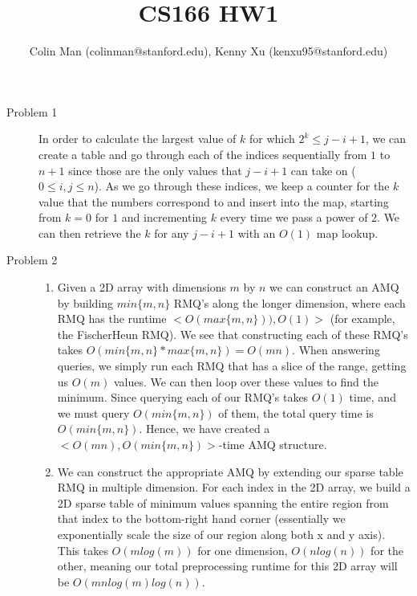 \documentclass[11pt,oneside,a4paper]{article}
\begin{document}
\title{CS166 HW1}
\author{Colin Man (colinman@stanford.edu), Kenny Xu (kenxu95@stanford.edu)}

\maketitle

\begin{description}

\item[Problem 1]\noindent
In order to calculate the largest value of $k$ for which $2^k \leq j - i + 1$, we can create a table and go through each of the indices sequentially from $1$ to $n + 1$ since those are the only values that $j-i+1$ can take on ($0\leq i,j \leq n$). As we go through these indices, we keep a counter for the $k$ value that the numbers correspond to and insert into the map, starting from $k=0$ for $1$ and incrementing $k$ every time we pass a power of $2$. We can then retrieve the $k$ for any $j-i+1$ with an $O(1)$ map lookup.

\newpage

\item[Problem 2]\noindent
\begin{enumerate}[label=\roman*]
\item Given a 2D array with dimensions $m$ by $n$ we can construct an AMQ by building $min\{m, n\}$ RMQ's along the longer dimension, where each RMQ has the runtime $< O(max\{m, n\})), O(1)>$ (for example, the FischerHeun RMQ). We see that constructing each of these RMQ's takes $O(min\{m, n\} * max\{m, n\}) = O(mn)$. When answering queries, we simply run each RMQ that has a slice of the range, getting us $O(m)$ values. We can then loop over these values to find the minimum. Since querying each of our RMQ's takes $O(1)$ time, and we must query $O(min\{m, n\})$ of them, the total query time is $O(min\{m, n\})$. Hence, we have created a $<O(mn), O(min\{m, n\})>$-time AMQ structure.

\item We can construct the appropriate AMQ by extending our sparse table RMQ in multiple dimension. For each index in the 2D array, we build a 2D sparse table of minimum values spanning the entire region from that index to the bottom-right hand corner (essentially we exponentially scale the size of our region along both x and y axis). This takes $O(mlog(m))$ for one dimension, $O(nlog(n))$ for the other, meaning our total preprocessing runtime for this 2D array will be $O(mnlog(m)log(n))$.\\


\end{enumerate}
\end{description}
\end{document}
